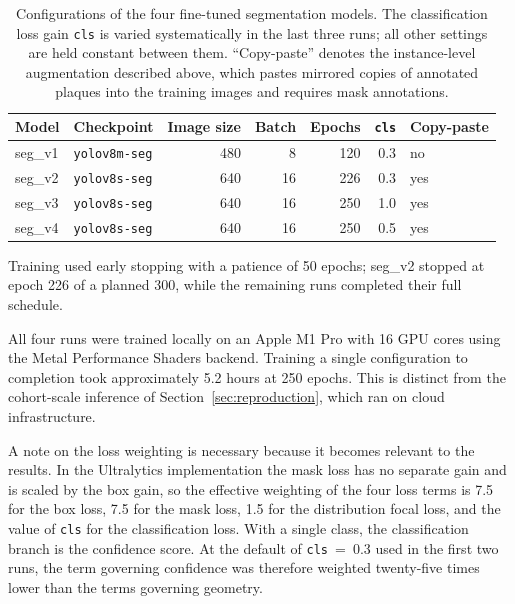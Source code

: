 \begin{table}[H]
\centering
\caption[Training configurations]{Configurations of the four fine-tuned segmentation models. The
classification loss gain \texttt{cls} is varied systematically in the last three runs; all other
settings are held constant between them. ``Copy-paste'' denotes the instance-level augmentation
described above, which pastes mirrored copies of annotated plaques into the training images and
requires mask annotations.}
\label{tab:training-configs}
\begin{tabular}{llrrrrl}
\hline
Model & Checkpoint & Image size & Batch & Epochs & \texttt{cls} & Copy-paste \\
\hline
seg\_v1 & \texttt{yolov8m-seg} & 480 & 8  & 120 & 0.3 & no \\
seg\_v2 & \texttt{yolov8s-seg} & 640 & 16 & 226 & 0.3 & yes \\
seg\_v3 & \texttt{yolov8s-seg} & 640 & 16 & 250 & 1.0 & yes \\
seg\_v4 & \texttt{yolov8s-seg} & 640 & 16 & 250 & 0.5 & yes \\
\hline
\end{tabular}
\end{table}

Training used early stopping with a patience of 50 epochs; seg\_v2 stopped at epoch 226 of a
planned 300, while the remaining runs completed their full schedule.

All four runs were trained locally on an Apple M1 Pro with 16 GPU cores using the Metal
Performance Shaders backend. Training a single configuration to completion took approximately
5.2 hours at 250 epochs. This is distinct from the cohort-scale inference of
Section~\ref{sec:reproduction}, which ran on cloud infrastructure.

A note on the loss weighting is necessary because it becomes relevant to the results. In the
Ultralytics implementation the mask loss has no separate gain and is scaled by the box gain, so
the effective weighting of the four loss terms is 7.5 for the box loss, 7.5 for the mask loss, 1.5
for the distribution focal loss, and the value of \texttt{cls} for the classification loss. With a
single class, the classification branch is the confidence score. At the default of
\texttt{cls}~=~0.3 used in the first two runs, the term governing confidence was therefore
weighted twenty-five times lower than the terms governing geometry.

